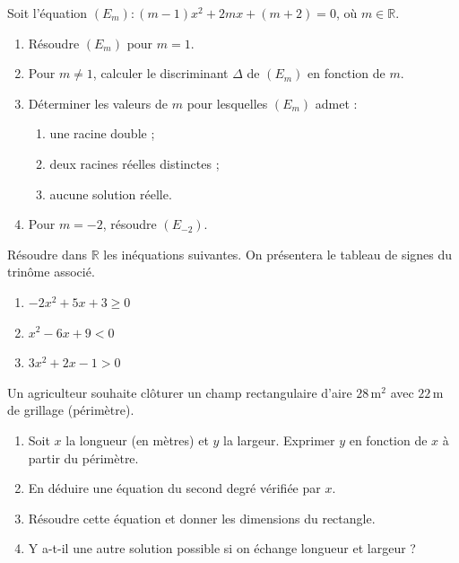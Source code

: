 \documentclass[11pt]{article}
\begin{document}
\begin{exercice}
Soit l'équation $(E_m) : (m-1)x^2 + 2mx + (m+2) = 0$, où $m \in \mathbb{R}$.
\begin{enumerate}
    \item Résoudre $(E_m)$ pour $m = 1$.
    \item Pour $m \neq 1$, calculer le discriminant $\Delta$ de $(E_m)$ en fonction de $m$.
    \item Déterminer les valeurs de $m$ pour lesquelles $(E_m)$ admet :
    \begin{enumerate}
        \item une racine double ;
        \item deux racines réelles distinctes ;
        \item aucune solution réelle.
    \end{enumerate}
    \item Pour $m = -2$, résoudre $(E_{-2})$.
\end{enumerate}
\end{exercice}

\begin{exercice}
Résoudre dans $\mathbb{R}$ les inéquations suivantes. On présentera le tableau de signes du trinôme associé.
\begin{enumerate}
    \item $-2x^2 + 5x + 3 \ge 0$
    \item $x^2 - 6x + 9 < 0$
    \item $3x^2 + 2x - 1 > 0$
\end{enumerate}
\end{exercice}

\begin{exercice}
Un agriculteur souhaite clôturer un champ rectangulaire d'aire $28\,\text{m}^2$ avec $22\,\text{m}$ de grillage (périmètre).
\begin{enumerate}
    \item Soit $x$ la longueur (en mètres) et $y$ la largeur. Exprimer $y$ en fonction de $x$ à partir du périmètre.
    \item En déduire une équation du second degré vérifiée par $x$.
    \item Résoudre cette équation et donner les dimensions du rectangle.
    \item Y a-t-il une autre solution possible si on échange longueur et largeur ?
\end{enumerate}
\end{exercice}
\end{document}
